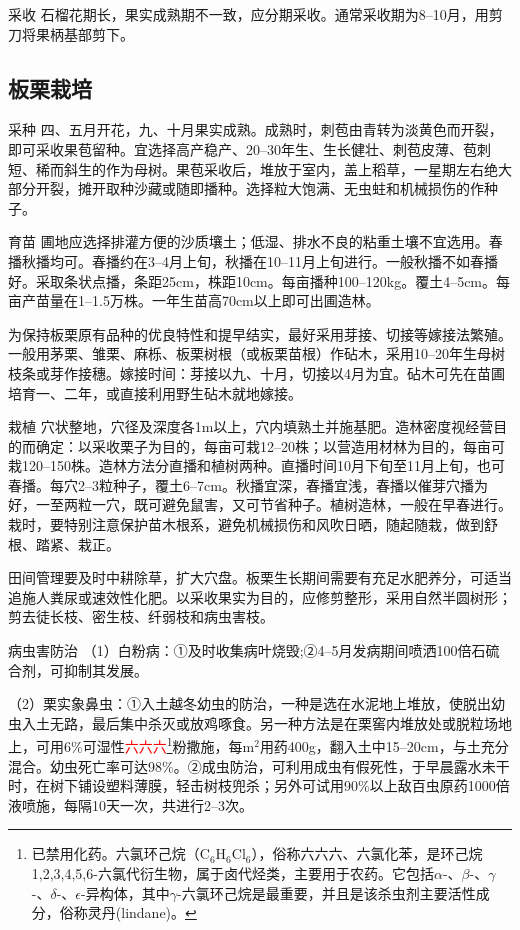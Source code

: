 \documentclass{ctexbook}
\begin{document}
采收 石榴花期长，果实成熟期不一致，应分期采收。通常采收期为8--10月，用剪刀将果柄基部剪下。
\subsection{板栗栽培}
采种 四、五月开花，九、十月果实成熟。成熟时，刺苞由青转为淡黄色而开裂，即可采收果苞留种。宜选择高产稳产、20--30年生、生长健壮、刺苞皮薄、苞刺短、稀而斜生的作为母树。果苞采收后，堆放于室内，盖上稻草，一星期左右绝大部分开裂，摊开取种沙藏或随即播种。选择粒大饱满、无虫蛀和机械损伤的作种子。

育苗 圃地应选择排灌方便的沙质壤土；低湿、排水不良的粘重土壤不宜选用。春播秋播均可。春播约在3--4月上旬，秋播在10--11月上旬进行。一般秋播不如春播好。采取条状点播，条距25cm，株距10cm。每亩播种100--120kg。覆土4--5cm。每亩产苗量在1--1.5万株。一年生苗高70cm以上即可出圃造林。

为保持板栗原有品种的优良特性和提早结实，最好采用芽接、切接等嫁接法繁殖。一般用茅栗、雏栗、麻栎、板栗树根（或板栗苗根）作砧木，采用10--20年生母树枝条或芽作接穗。嫁接时间：芽接以九、十月，切接以4月为宜。砧木可先在苗圃培育一、二年，或直接利用野生砧木就地嫁接。

栽植 穴状整地，穴径及深度各1m以上，穴内填熟土并施基肥。造林密度视经营目的而确定：以采收栗子为目的，每亩可栽12--20株；以营造用材林为目的，每亩可栽120--150株。造林方法分直播和植树两种。直播时间10月下旬至11月上旬，也可春播。每穴2--3粒种子，覆土6--7cm。秋播宜深，春播宜浅，春播以催芽穴播为好，一至两粒一穴，既可避免鼠害，又可节省种子。植树造林，一般在早春进行。栽时，要特别注意保护苗木根系，避免机械损伤和风吹日晒，随起随栽，做到舒根、踏紧、栽正。

田间管理要及时中耕除草，扩大穴盘。板栗生长期间需要有充足水肥养分，可适当追施人粪尿或速效性化肥。以采收果实为目的，应修剪整形，采用自然半圆树形；剪去徒长枝、密生枝、纤弱枝和病虫害枝。

病虫害防治
（1）白粉病：①及时收集病叶烧毁;②4--5月发病期间喷洒100倍石硫合剂，可抑制其发展。

（2）栗实象鼻虫：①入土越冬幼虫的防治，一种是选在水泥地上堆放，使脱出幼虫入土无路，最后集中杀灭或放鸡啄食。另一种方法是在栗窖内堆放处或脱粒场地上，可用6\%可湿性\textcolor{red}{六六六}\footnote{已禁用化药。六氯环己烷（C$_6$H$_6$Cl$_6$），俗称六六六、六氯化苯，是环己烷1,2,3,4,5,6-六氯代衍生物，属于卤代烃类，主要用于农药。它包括$\alpha$-、$\beta$-、$\gamma$-、$\delta$-、$\epsilon$-异构体，其中$\gamma$-六氯环己烷是最重要，并且是该杀虫剂主要活性成分，俗称灵丹(lindane)。}粉撒施，每m$^2$用药400g，翻入土中15--20cm，与土充分混合。幼虫死亡率可达98\%。②成虫防治，可利用成虫有假死性，于早晨露水未干时，在树下铺设塑料薄膜，轻击树枝兜杀；另外可试用90\%以上敌百虫原药1000倍液喷施，每隔10天一次，共进行2--3次。
\end{document}
